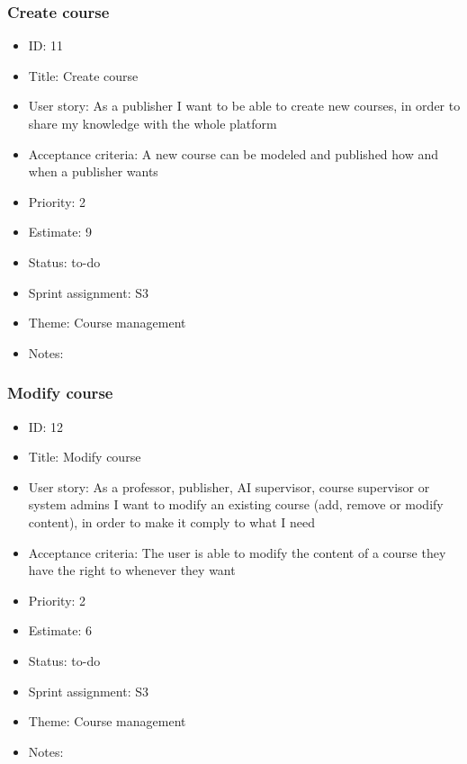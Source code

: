 \subsubsection{Create course}
\begin{itemize}
	\item ID: 11
	\item Title: Create course
	\item User story: As a publisher I want to be able to create new courses, in order to share my knowledge with the whole platform
	\item Acceptance criteria: A new course can be modeled and published how and when a publisher wants
	\item Priority: 2
	\item Estimate: 9
	\item Status: to-do
	\item Sprint assignment: S3
	\item Theme: Course management
	\item Notes:
\end{itemize}

\subsubsection{Modify course}
\begin{itemize}
	\item ID: 12
	\item Title: Modify course
	\item User story: As a professor, publisher, AI supervisor, course supervisor or system admins I want to modify an existing course (add, remove or modify content), in order to make it comply to what I need
	\item Acceptance criteria: The user is able to modify the content of a course they have the right to whenever they want
	\item Priority: 2
	\item Estimate: 6
	\item Status: to-do
	\item Sprint assignment: S3
	\item Theme: Course management
	\item Notes:
\end{itemize}

